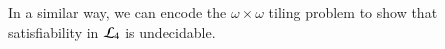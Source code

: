 \begin{pf}
%
%
\end{pf}


In a similar way, we can encode the $\omega
\times \omega$ tiling problem to show that satisfiability in
$\mathcal{L}_4$ is undecidable.

